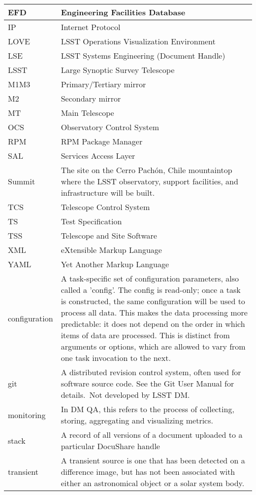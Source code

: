 \begin{longtable}{|l|p{}|}
EFD & Engineering Facilities Database \\\hline
IP & Internet Protocol \\\hline
LOVE & LSST Operations Visualization Environment \\\hline
LSE & LSST Systems Engineering (Document Handle) \\\hline
LSST & Large Synoptic Survey Telescope \\\hline
M1M3 & Primary/Tertiary mirror \\\hline
M2 & Secondary mirror \\\hline
MT & Main Telescope \\\hline
OCS & Observatory Control System \\\hline
RPM & RPM Package Manager \\\hline
SAL & Services Access Layer \\\hline
Summit & The site on the Cerro Pachón, Chile mountaintop where the LSST observatory, support facilities, and infrastructure will be built. \\\hline
TCS & Telescope Control System \\\hline
TS & Test Specification \\\hline
TSS & Telescope and Site Software \\\hline
XML & eXtensible Markup Language \\\hline
YAML & Yet Another Markup Language \\\hline
configuration & A task-specific set of configuration parameters, also called a 'config'. The config is read-only; once a task is constructed, the same configuration will be used to process all data. This makes the data processing more predictable: it does not depend on the order in which items of data are processed. This is distinct from arguments or options, which are allowed to vary from one task invocation to the next. \\\hline
git & A distributed revision control system, often used for software source code. See the Git User Manual for details. Not developed by LSST DM. \\\hline
monitoring & In DM QA, this refers to the process of collecting, storing, aggregating and visualizing metrics. \\\hline
stack & A record of all versions of a document uploaded to a particular DocuShare handle \\\hline
transient & A transient source is one that has been detected on a difference image, but has not been associated with either an astronomical object or a solar system body. \\\hline
\end{longtable}
